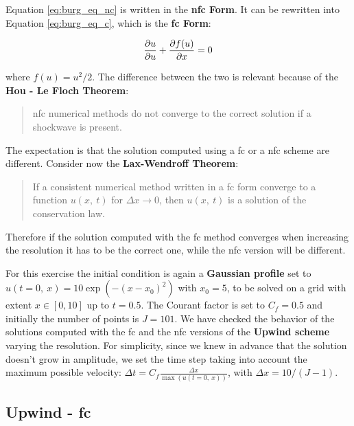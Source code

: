 \documentclass[11pt, a4paper]{article}
\begin{document}
Equation \ref{eq:burg_eq_nc} is written in the \textbf{\acrfull{nfc} Form}. It can be rewritten into Equation \ref{eq:burg_eq_c}, which is the \textbf{\acrfull{fc} Form}:

\begin{equation} \label{eq:burg_eq_c}
    \pdv{u}{u} + \pdv{f(u)}{x} = 0
\end{equation}

\noindent
where \(f(u) = u^2 / 2\). The difference between the two is relevant because of the \textbf{Hou - Le Floch Theorem}:

\begin{quote}
    \acrlong{nfc} numerical methods do not converge to the correct solution if a shockwave is present.
\end{quote}

\noindent
The expectation is that the solution computed using a \acrshort{fc} or a \acrshort{nfc} scheme are different. Consider now the \textbf{Lax-Wendroff Theorem}:

\begin{quote}
    If a consistent numerical method written in a \acrshort{fc} form converge to a function \(u(x,\ t)\) for \(\Delta x \to 0\), then \(u(x,\ t)\) is a solution of the conservation law.
\end{quote}

\noindent
Therefore if the solution computed with the \acrshort{fc} method converges when increasing the resolution it has to be the correct one, while the \acrshort{nfc} version will be different.

For this exercise the initial condition is again a \textbf{Gaussian profile} set to \(u(t = 0,\ x) = 10 \exp(-(x - x_0)^2)\) with \(x_0 = 5\), to be solved on a grid with extent \(x \in [0, 10]\) up to \(t = 0.5\). The Courant factor is set to \(C_f = 0.5\) and initially the number of points is \(J = 101\). We have checked the behavior of the solutions computed with the \acrshort{fc} and the \acrshort{nfc} versions of the \textbf{Upwind scheme} varying the resolution. For simplicity, since we knew in advance that the solution doesn't grow in amplitude, we set the time step taking into account the maximum possible velocity: \(\Delta t = C_f \frac{\Delta x}{\max(u(t = 0,\ x))}\), with \(\Delta x = 10 / (J - 1)\).

\subsection{Upwind - \acrlong{fc}}
\end{document}
